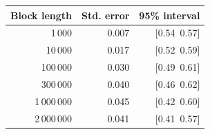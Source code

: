 \begin{tabular}{rrr}
\toprule
Block length & Std. error & 95\% interval \\
\midrule
1\,000 & 0.007 & [0.54\, 0.57] \\
10\,000 & 0.017 & [0.52\, 0.59] \\
100\,000 & 0.030 & [0.49\, 0.61] \\
300\,000 & 0.040 & [0.46\, 0.62] \\
1\,000\,000 & 0.045 & [0.42\, 0.60] \\
2\,000\,000 & 0.041 & [0.41\, 0.57] \\
\bottomrule
\end{tabular}

